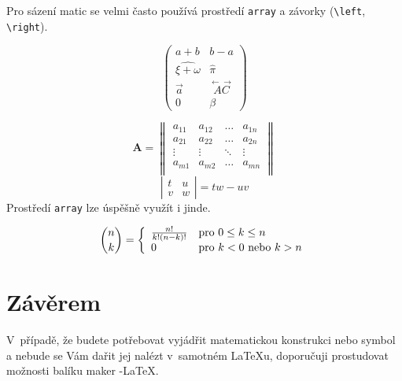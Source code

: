 \documentclass[11pt,a4paper,twocolumn]{article}
\theoremstyle{definition}
\begin{document}
Pro sázení matic se velmi často používá prostředí \texttt{array} a závorky (\verb|\left|, \verb|\right|). 

$$\left(
\begin{array}{cc}
    a+b & b -a \\
    \widehat{\xi + \omega} & \hat{\pi} \\
    \vec{a} & \stackrel{\leftarrow\!\rightarrow}{AC} \\
    0 & \beta
\end{array}
\right)$$

$$\textbf{A} = \left\|
\begin{array}{cccc}
    a_{11} & a_{12} & \hdots & a_{1n} \\
    a_{21} & a_{22} & \hdots & a_{2n} \\
    \vdots & \vdots & \ddots & \vdots \\
    a_{m1} & a_{m2} & \hdots & a_{mn} \\
\end{array} \right\|$$
$$
\left|\begin{array}{cc}
    t & u \\
    v & w
\end{array}\right|
= tw - uv $$
Prostředí \texttt{array} lze úspěšně využít i jinde.

$$ \binom{n}{k} = \left\{ 
\begin{array}{l l} 
    \frac{n!}{k!(n-k)!} & \text{pro } 0 \leq k \leq n \\
    0 & \text{pro } k < 0  \text{ nebo } k > n
\end{array}\right.$$


\section{Závěrem}

V~případě, že budete potřebovat vyjádřit matematickou konstrukci nebo symbol a nebude se Vám dařit jej nalézt v~samotném LaTeXu, doporučuji prostudovat možnosti balíku maker \AmS-\LaTeX.
\end{document}
